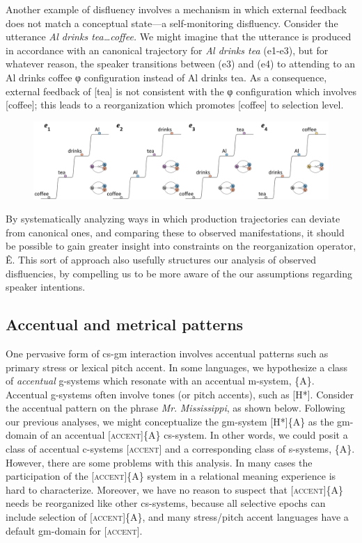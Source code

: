   Another example of disfluency involves a mechanism in which external feedback does not match a conceptual state—a self-monitoring disfluency. Consider the utterance \textit{Al drinks tea…coffee.} We might imagine that the utterance is produced in accordance with an canonical trajectory for \textit{Al drinks tea} (e1-e3), but for whatever reason, the speaker transitions between (e3) and (e4) to attending to an {\textbar}Al drinks coffee{\textbar} φ configuration instead of {\textbar}Al drinks tea{\textbar}. As a consequence, external feedback of [tea] is not consistent with the φ configuration which involves [coffee]; this leads to a reorganization which promotes [coffee] to selection level.

  
\begin{figure}
\includegraphics[width=\textwidth]{figures/Tilsen-img62.png}
\caption{\missingcaption}
\label{fig:}
\end{figure}
 

  By systematically analyzing ways in which production trajectories can deviate from canonical ones, and comparing these to observed manifestations, it should be possible to gain greater insight into constraints on the reorganization operator, Ê. This sort of approach also usefully structures our analysis of observed disfluencies, by compelling us to be more aware of the our assumptions regarding speaker intentions.

\subsection{Accentual and metrical patterns}

One pervasive form of cs-gm interaction involves accentual patterns such as primary stress or lexical pitch accent. In some languages, we hypothesize a class of \textit{accentual} g-systems which resonate with an accentual m-system, \{A\}. Accentual g-systems often involve tones (or pitch accents), such as [H*]. Consider the accentual pattern on the phrase \textit{Mr}. \textit{Mississippi}, as shown below. Following our previous analyses, we might conceptualize the gm-system [H*]\{A\} as the gm-domain of an accentual [\textsc{accent}]\{A\} cs-system. In other words, we could posit a class of accentual c-systems [\textsc{accent}] and a corresponding class of s-systems, \{A\}. However, there are some problems with this analysis. In many cases the participation of the [\textsc{accent}]\{A\} system in a relational meaning experience is hard to characterize. Moreover, we have no reason to suspect that [\textsc{accent}]\{A\} needs be reorganized like other cs-systems, because all selective epochs can include selection of [\textsc{accent}]\{A\}, and many stress/pitch accent languages have a default gm-domain for [\textsc{accent}].

